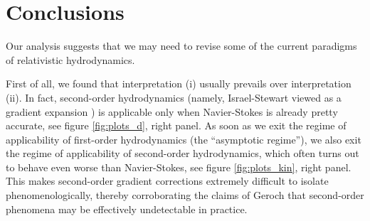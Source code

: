 \documentclass[a4paper, amsfonts, amssymb, amsmath, reprint, showkeys, nofootinbib, twoside, onecolumn,notitlepage]{revtex4-2}
\begin{document}






\section{Conclusions}

Our analysis suggests that we {may need to} revise some of the current paradigms of relativistic hydrodynamics.

First of all, we found that interpretation (i) {usually} prevails over interpretation (ii). In fact, second-order hydrodynamics (namely, Israel-Stewart viewed as a gradient expansion \cite{Baier2008}) is applicable only when Navier-Stokes is already pretty accurate, see figure \ref{fig:plots_d}, right panel. As soon as we exit the regime of applicability of first-order hydrodynamics (the ``asymptotic regime''), we also exit the regime of applicability of second-order hydrodynamics, which {often} turns out to behave even worse than Navier-Stokes, see figure \ref{fig:plots_kin}, right panel. This makes second-order gradient corrections extremely difficult to isolate phenomenologically, thereby corroborating the claims of Geroch \cite{Geroch2001} that second-order phenomena may be effectively undetectable in practice.
\end{document}
